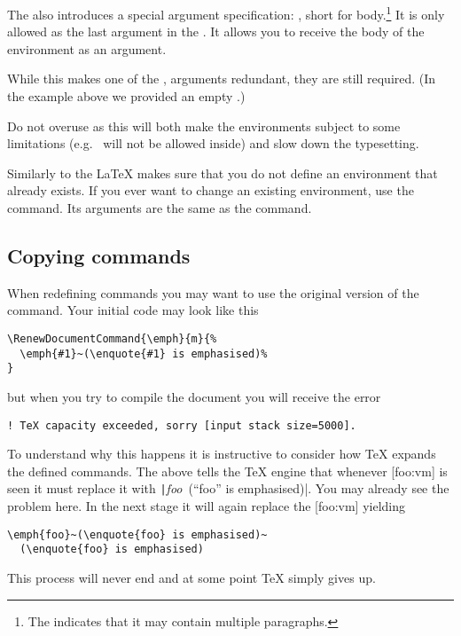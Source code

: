 The  also introduces a special argument
specification: , short for body.\footnote{The \cargv{+} indicates
  that it may contain multiple paragraphs.} It is only allowed as the last
argument in the . It allows you to receive the body of the
environment as an argument.
While this makes one of the ,  arguments redundant,
they are still required. (In the example above we provided an empty .)

Do not overuse  as this will both make the environments subject to
some limitations (e.g.\  will not be allowed inside) and slow down the
typesetting.

Similarly to the  \LaTeX{} makes sure that you do not
define an environment that already exists. If you ever want to change an
existing environment, use the  command. Its
arguments are the same as the  command.

\subsection{Copying commands}\label{sec:copyingcommands}

When redefining commands you may want to use the original version of the
command. Your initial code may look like this
\begin{verbatim}
\RenewDocumentCommand{\emph}{m}{%
  \emph{#1}~(\enquote{#1} is emphasised)%
}
\end{verbatim}
but when you try to compile the document you will receive the error
\begin{verbatim}
! TeX capacity exceeded, sorry [input stack size=5000].
\end{verbatim}

To understand why this happens it is instructive to consider how \TeX{} expands
the defined commands. The above  tells the \TeX{}
engine that whenever [foo:vm] is seen it must replace it with
\texttt|\emph{foo}~(\enquote{foo} is emphasised)|. You may already see the
problem here. In the next stage it will again replace the [foo:vm]
yielding
\begin{verbatim}
\emph{foo}~(\enquote{foo} is emphasised)~
  (\enquote{foo} is emphasised)
\end{verbatim}
This process will never end and at some point \TeX{}
simply gives up.

